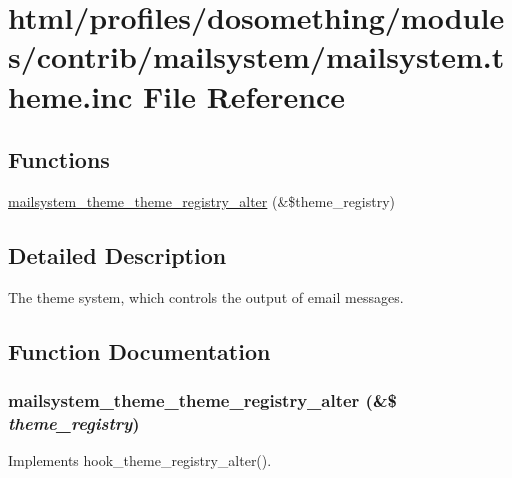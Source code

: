 \hypertarget{mailsystem_8theme_8inc}{
\section{html/profiles/dosomething/modules/contrib/mailsystem/mailsystem.theme.inc File Reference}
\label{mailsystem_8theme_8inc}
}
\subsection*{Functions}
\begin{DoxyCompactItemize}
\item 
\hyperlink{mailsystem_8theme_8inc_a641369522a5e897ab11ac5a31c01fd3b}{mailsystem\_\-theme\_\-theme\_\-registry\_\-alter} (\&\$theme\_\-registry)
\end{DoxyCompactItemize}


\subsection{Detailed Description}
The theme system, which controls the output of email messages. 

\subsection{Function Documentation}
\hypertarget{mailsystem_8theme_8inc_a641369522a5e897ab11ac5a31c01fd3b}{
\subsubsection[{mailsystem\_\-theme\_\-theme\_\-registry\_\-alter}]{\setlength{\rightskip}{0pt plus 5cm}mailsystem\_\-theme\_\-theme\_\-registry\_\-alter (\&\$ {\em theme\_\-registry})}}
\label{mailsystem_8theme_8inc_a641369522a5e897ab11ac5a31c01fd3b}
Implements hook\_\-theme\_\-registry\_\-alter(). 